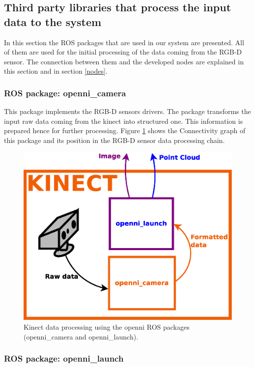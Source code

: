 \subsection{Third party libraries that process the input data to the system}
\label{ros_packages}
In this section the ROS packages that are used in our system are presented. 
All of them are used for the initial processing of the data coming from the RGB-D sensor. 
The connection between them and the developed nodes are explained in this section and in section \ref{nodes}.

\subsubsection{ROS package: openni\_camera}
\label{openni_camera}

This package implements the RGB-D sensors drivers.
The package transforms the input raw data coming from the kinect into structured one. 
This information is prepared hence for further processing. 
Figure \ref{diagram_kinect_data} shows the Connectivity graph of this package and its position in the RGB-D sensor data processing chain. 
 
 		\begin{figure}[H]
			\begin{center}
			\includegraphics[width=0.5\linewidth]{img/diagrams/kinect_data.eps}
			\caption[Kinect data processing]{Kinect data processing using the openni ROS packages (openni\_camera and openni\_launch).}
			\label{diagram_kinect_data}
			\end{center}
		\end{figure}


\subsubsection{ROS package: openni\_launch}
\label{openni_launch}


